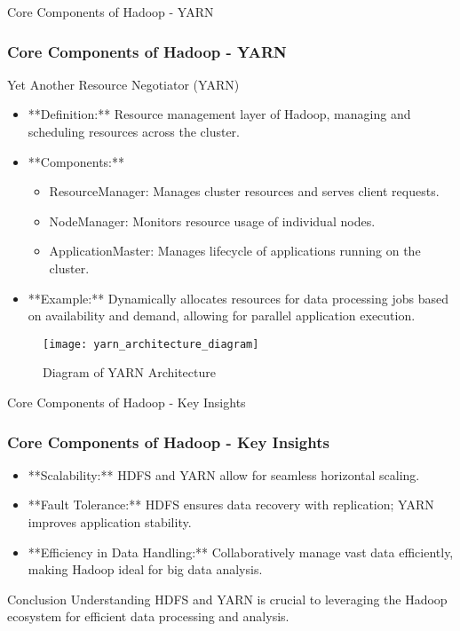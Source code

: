 \documentclass[aspectratio=169]{beamer}
\begin{document}
\begin{frame}[fragile]{Core Components of Hadoop - YARN}
    \frametitle{Core Components of Hadoop - YARN}
    \begin{block}{Yet Another Resource Negotiator (YARN)}
        \begin{itemize}
            \item **Definition:** Resource management layer of Hadoop, managing and scheduling resources across the cluster.
            \item **Components:**
                \begin{itemize}
                    \item ResourceManager: Manages cluster resources and serves client requests.
                    \item NodeManager: Monitors resource usage of individual nodes.
                    \item ApplicationMaster: Manages lifecycle of applications running on the cluster.
                \end{itemize}
            \item **Example:** Dynamically allocates resources for data processing jobs based on availability and demand, allowing for parallel application execution.
        \end{itemize}
    \end{block}
    \begin{figure}
        \centering
        \texttt{[image: yarn\_architecture\_diagram]} %
        \caption{Diagram of YARN Architecture}
    \end{figure}
\end{frame}

\begin{frame}[fragile]{Core Components of Hadoop - Key Insights}
    \frametitle{Core Components of Hadoop - Key Insights}
    \begin{itemize}
        \item **Scalability:** HDFS and YARN allow for seamless horizontal scaling.
        \item **Fault Tolerance:** HDFS ensures data recovery with replication; YARN improves application stability.
        \item **Efficiency in Data Handling:** Collaboratively manage vast data efficiently, making Hadoop ideal for big data analysis.
    \end{itemize}
    \begin{block}{Conclusion}
        Understanding HDFS and YARN is crucial to leveraging the Hadoop ecosystem for efficient data processing and analysis.
    \end{block}
\end{frame}
\end{document}
